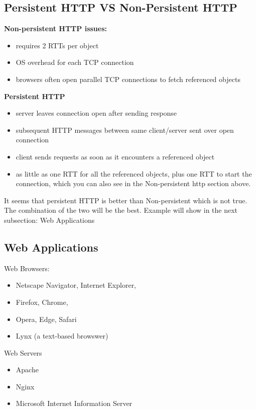 \documentclass[fancy,11pt,titlestyle=display]{style/elegantbook}
\begin{document}
\subsection{Persistent HTTP VS Non-Persistent HTTP}
\textbf{Non-persistent HTTP issues:}
\begin{itemize}
\item requires 2 RTTs per object
\item OS overhead for each TCP
connection
\item browsers often open
parallel TCP connections to
fetch referenced objects
\end{itemize}
\*
\textbf{Persistent HTTP}
\begin{itemize}
\item server leaves connection
open after sending
response
\item subsequent HTTP
messages between same
client/server sent over
open connection
\item client sends requests as
soon as it encounters a
referenced object
\item as little as one RTT for all
the referenced objects, plus one RTT to start the connection, which you can also see in the Non-persistent http section above.
\end{itemize}

\par It seems that persistent HTTP is better than Non-persistent which is not true.
The combination of the two will be the best. Example will show in the next subsection: Web Applications

\subsection{Web Applications}
Web Browsers:
\begin{itemize}
\item Netscape Navigator, Internet Explorer,
\item Firefox, Chrome,
\item Opera, Edge, Safari
\item Lynx (a text-based browswer)
\end{itemize}

Web Servers
\begin{itemize}
\item Apache
\item Nginx
\item Microsoft Internet Information Server
\end{itemize}
\end{document}
